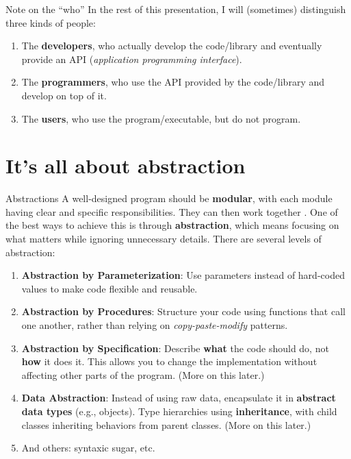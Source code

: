\documentclass[10pt,
aspectratio=169
]{beamer}
\begin{document}
\begin{frame}{Note on the ``who''}
In the rest of this presentation, I will (sometimes) distinguish three kinds of people:\begin{enumerate}
	\item The \textbf{developers}, who actually develop the code/library and eventually provide an API (\textit{application programming interface}).
	\item The \textbf{programmers}, who use the API provided by the code/library and develop on top of it.
	\item The \textbf{users}, who use the program/executable, but do not program.
\end{enumerate}
\end{frame}

\section{It's all about abstraction}

\begin{frame}{Abstractions}
	A well-designed program should be \textbf{modular}, with each module having clear and specific responsibilities. They can then work together . One of the best ways to achieve this is through \textbf{abstraction}, which means focusing on what matters while ignoring unnecessary details. There are several levels of abstraction:
	\begin{enumerate}
		\item \textbf{Abstraction by Parameterization}: Use parameters instead of hard-coded values to make code flexible and reusable.
		\item \textbf{Abstraction by Procedures}: Structure your code using functions that call one another, rather than relying on \textit{copy-paste-modify} patterns.
		\item \textbf{Abstraction by Specification}: Describe \textbf{what} the code should do, not \textbf{how} it does it. This allows you to change the implementation without affecting other parts of the program. (More on this later.)
		\item \textbf{Data Abstraction}: Instead of using raw data, encapsulate it in \textbf{abstract data types} (e.g., objects). Type hierarchies using \textbf{inheritance}, with child classes inheriting behaviors from parent classes. (More on this later.)
		\item And others: syntaxic sugar, etc.
	\end{enumerate}
\end{frame}
\end{document}
